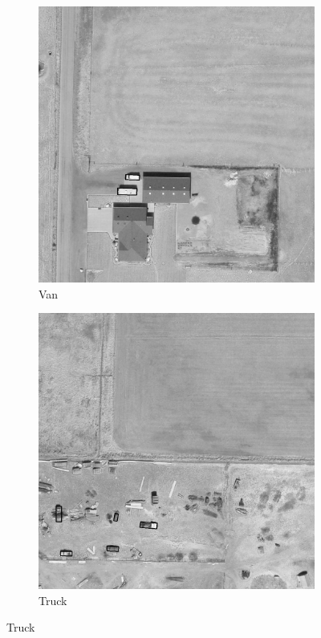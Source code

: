 \begin{figure}[h!]
    \centering
    \begin{subfigure}[t]{0.38\textwidth}
        \centering
        \includegraphics[width=\linewidth]{images/015Results/03ablation/comp_images/ground_truth/198.png}
        \caption{Van}
    \end{subfigure}
    \begin{subfigure}[t]{0.38\textwidth}
        \centering
        \includegraphics[width=\linewidth]{images/015Results/03ablation/comp_images/ground_truth/212.png}
        \caption{Truck}
    \end{subfigure}
    

\end{figure}
